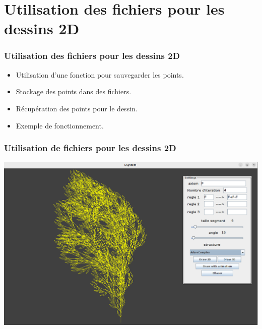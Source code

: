 \section{Utilisation des fichiers pour les dessins 2D}

\begin{frame}
	\frametitle{Utilisation des fichiers pour les dessins 2D}
 \begin{itemize}
             \item Utilisation d'une fonction pour sauvegarder les points.
             \item Stockage des points dans des fichiers.
             \item Récupération des points pour le dessin.
             \item Exemple de fonctionnement.
         \end{itemize}
\end{frame}
\begin{frame}
	\frametitle{Utilisation de fichiers pour les dessins 2D}
    \centering
        \includegraphics[scale=0.25]{images/capture_fichier.png}
\end{frame}
